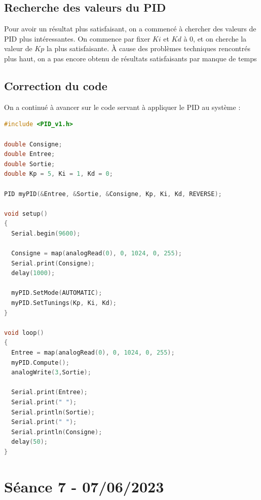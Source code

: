 \documentclass[11pt,a4paper]{article}
\begin{document}
\subsection{Recherche des valeurs du PID}
Pour avoir un résultat plus satisfaisant, on a commencé à chercher des valeurs de PID plus intéressantes. On commence par fixer $Ki$ et $Kd$ à 0, et on cherche la valeur de $Kp$ la plus satisfaisante. À cause des problèmes techniques rencontrés plus haut, on a pas encore obtenu de résultats satisfaisants par manque de temps

\subsection{Correction du code}
On a continué à avancer sur le code servant à appliquer le PID au système :
\begin{lstlisting}[language = C]
#include <PID_v1.h>

double Consigne;
double Entree;
double Sortie;
double Kp = 5, Ki = 1, Kd = 0;

PID myPID(&Entree, &Sortie, &Consigne, Kp, Ki, Kd, REVERSE);

void setup()
{
  Serial.begin(9600);

  Consigne = map(analogRead(0), 0, 1024, 0, 255);
  Serial.print(Consigne);
  delay(1000);

  myPID.SetMode(AUTOMATIC);
  myPID.SetTunings(Kp, Ki, Kd);  
}

void loop()
{
  Entree = map(analogRead(0), 0, 1024, 0, 255);
  myPID.Compute();
  analogWrite(3,Sortie);

  Serial.print(Entree);
  Serial.print(" ");
  Serial.println(Sortie);
  Serial.print(" ");  
  Serial.println(Consigne);
  delay(50);
}
\end{lstlisting}

\section{Séance 7 - 07/06/2023}

\pagebreak
\end{document}
